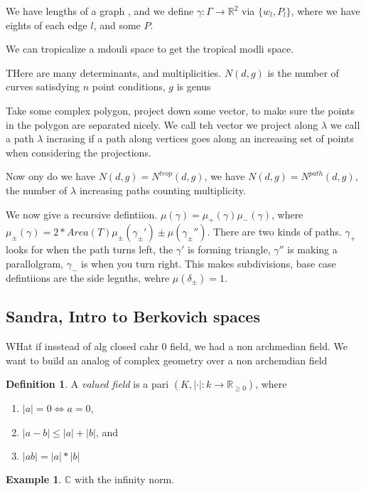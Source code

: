 \documentclass[11pt]{article}
\theoremstyle{definition}
\newtheorem{protoexample}{Example}[section]
\newenvironment{ex}
   {\begin{protoexample}}
   {\end{protoexample}}
\newtheorem{protodefinition}{Definition}[section]
\newenvironment{define}
   {\begin{protodefinition}}
   {\end{protodefinition}}
\def\RR{{\mathbb R}}
\def\CC{{\mathbb C}}
\begin{document}
We have lengths of a graph , and we define $\gamma:\Gamma \rightarrow \RR^2$ via $\{w_l,P_l\}$, where we have eights of each edge $l$, and some $P$.


We can tropicalize a mdouli space to get the tropical modli space.

THere are many determinants, and multiplicities. $N(d,g)$ is the number of curves satisdying $n$ point conditions, $g$ is genus

Take some complex polygon, project down some vector, to make sure the points in the polygon are separated nicely. We call teh vector we project along $\lambda$ we call a path $\lambda$ incrasing if a path along vertices goes along an increasing set of points when considering the projections. 

Now ony do we have $N(d,g)=N^{trop}(d,g)$, we have $N(d,g)=N^{path}(d,g)$, the number of $\lambda$ increasing paths counting multiplicity.


We now give a recursive defintiion. $\mu(\gamma)=\mu_+(\gamma)\mu_-(\gamma)$, where $\mu_\pm(\gamma) = 2 *Area(T) \mu_\pm(\gamma_\pm')\pm \mu(\gamma_\pm'')$. There are two kinds of paths. $\gamma_+$ looks for when the path turns left, the $\gamma'$ is forming triangle, $\gamma''$ is making a parallolgram, $\gamma_-$ is when you turn right. This makes subdivisions, base case defintiions are the side legnths, wehre $\mu(\delta_\pm)=1$.




\subsection{Sandra, Intro to Berkovich spaces}


WHat if insstead of alg closed cahr 0 field, we had a non archmedian field. We want to build an analog of complex geometry over a non archemdian field

\begin{define}
    A \emph{valued field} is a pari $(K,|\cdot|:k \rightarrow \RR_{\geq0})$, where 
    \begin{enumerate}
        \item $|a|= 0 \iff a=0$,
        \item $|a-b| \leq |a| + |b|$, and 
        \item $|ab|=|a|*|b|$
    \end{enumerate}
\end{define}


\begin{ex}
    $\CC$ with the infinity norm.
\end{ex}
\end{document}
